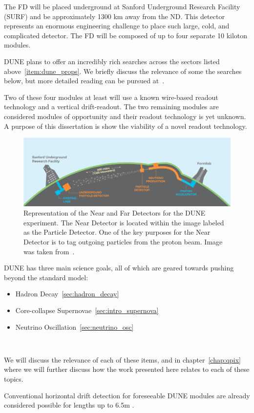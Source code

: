 The FD will be placed underground at Sanford Underground Research Facility (SURF) and be approximately 1300 km away from the ND.
This detector represents an enormous engineering challenge to place such large, cold, and complicated detector.
The FD will be composed of up to four separate 10 kiloton modules.

DUNE plans to offer an incredibly rich searches across the sectors listed above~\ref{item:dune_props}.
We briefly discuss the relevance of some the searches below, but more detailed reading can be pursued at~\citep{DUNE_FD_TDRv2_2020}.

Two of these four modules at least will use a known wire-based readout technology and a vertical drift-readout.
The two remaining modules are considered modules of opportunity and their readout technology is yet unknown.
A purpose of this dissertation is show the viability of a novel readout technology.

\begin{figure}[]
\centering
\includegraphics[width=\textwidth]{images/LBNE_Graphic_061615_2016.jpg}
\caption{Representation of the Near and Far Detectors for the DUNE experiment. The Near Detector is located within the image labeled as the Particle Detector. One of the key purposes for the Near Detector is to tag outgoing particles from the proton beam. Image was taken from~\citep{dune_cdr_2016_arxiv}.}
\end{figure}

DUNE has three main science goals, all of which are geared towards pushing beyond the standard model:
\begin{itemize}
    \item Hadron Decay~\ref{sec:hadron_decay}
    \item Core-collapse Supernovae~\ref{sec:intro_supernova}
    \item Neutrino Oscillation~\ref{sec:neutrino_osc}
\end{itemize}
~\label{item:dune_props}

We will discuss the relevance of each of these items, and in chapter~\ref{chap:qpix} where we will further discuss how the work presented here relates to each of these topics.

Conventional horizontal drift detection for foreseeable DUNE modules are already considered possible for lengths up to 6.5m \citep{DUNE_Vertical:Paulucci_2022}.
